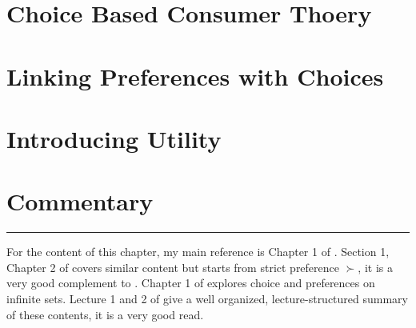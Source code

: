 \section{Choice Based Consumer Thoery}\label{chap2:sec2}


\section{Linking Preferences with Choices}\label{chap2:sec3}
%

\section{Introducing Utility}\label{chap2:sec4}
%

\section{Commentary}\label{chap2:sec5}
%

\vspace{0.5cm}
\noindent\rule{\textwidth}{0.4pt}

For the content of this chapter, my main reference is Chapter 1 of \citet{mas1995microeconomic}. Section 1, Chapter 2 of \citet{kreps1990acourse} covers similar content but starts from strict preference $\succ$, it is a very
good complement to \citet{mas1995microeconomic}. Chapter 1 of \citet{kreps2013microeconomic} explores choice and preferences on infinite sets. Lecture 1 and 2 of \citet{ariel2012lecture} give a well organized, lecture-structured summary of
these contents, it is a very good read.